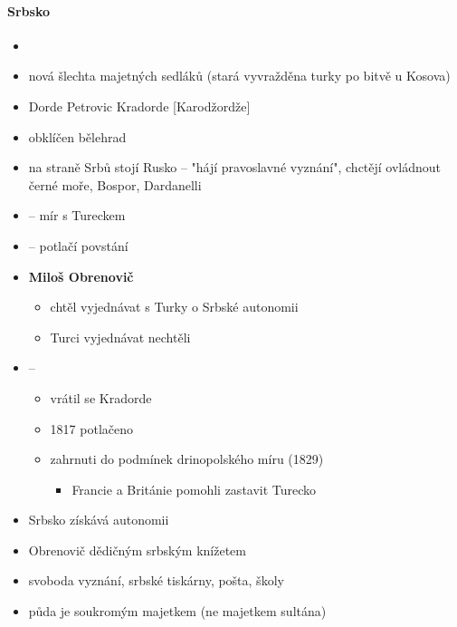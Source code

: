 \paragraph{Srbsko}
\begin{itemize}
\item {}
\item nová šlechta majetných sedláků (stará vyvražděna turky po bitvě u Kosova)
\item Dorde Petrovic Kradorde [Karodžordže]
\item obklíčen bělehrad
\item na straně Srbů stojí Rusko -- "hájí pravoslavné vyznání", chctějí ovládnout černé moře, Bospor, Dardanelli
\item {} -- mír s Tureckem
\item {} -- potlačí povstání
\item \textbf{Miloš Obrenovič}
	\begin{itemize}
	\item chtěl vyjednávat s Turky o Srbské autonomii
	\item Turci vyjednávat nechtěli
	\end{itemize}
\item {} -- 
	\begin{itemize}
	\item vrátil se Kradorde
	\item 1817 potlačeno
	\item zahrnuti do podmínek drinopolského míru (1829)
		\begin{itemize}
		\item Francie a Británie pomohli zastavit Turecko
		\end{itemize}
	\end{itemize}
\item Srbsko získává autonomii
\item Obrenovič dědičným srbským knížetem
\item svoboda vyznání, srbské tiskárny, pošta, školy
\item půda je soukromým majetkem (ne majetkem sultána)
\end{itemize}

